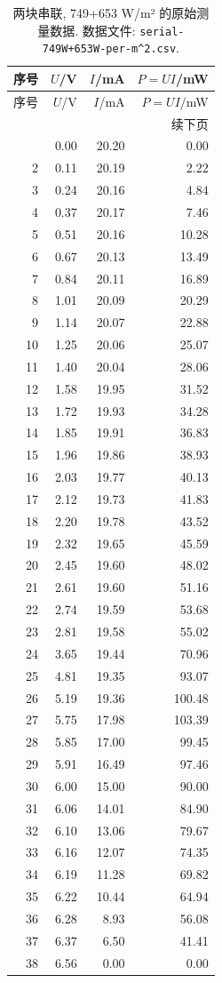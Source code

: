 \documentclass[UTF8,a4paper,11pt]{ctexart}
\begin{document}
\begin{longtable}{rrrr}
\caption{两块串联, 749+653 W/m² 的原始测量数据. 数据文件: \texttt{serial-749W+653W-per-m\textasciicircum{}2.csv}.}\\
\toprule
序号 & $U$/V & $I$/mA & $P=UI$/mW \\
\midrule
\endfirsthead
\toprule
序号 & $U$/V & $I$/mA & $P=UI$/mW \\
\midrule
\endhead
\midrule
\multicolumn{4}{r}{续下页} \\
\endfoot
\bottomrule
\endlastfoot
1 & 0.00 & 20.20 & 0.00 \\
2 & 0.11 & 20.19 & 2.22 \\
3 & 0.24 & 20.16 & 4.84 \\
4 & 0.37 & 20.17 & 7.46 \\
5 & 0.51 & 20.16 & 10.28 \\
6 & 0.67 & 20.13 & 13.49 \\
7 & 0.84 & 20.11 & 16.89 \\
8 & 1.01 & 20.09 & 20.29 \\
9 & 1.14 & 20.07 & 22.88 \\
10 & 1.25 & 20.06 & 25.07 \\
11 & 1.40 & 20.04 & 28.06 \\
12 & 1.58 & 19.95 & 31.52 \\
13 & 1.72 & 19.93 & 34.28 \\
14 & 1.85 & 19.91 & 36.83 \\
15 & 1.96 & 19.86 & 38.93 \\
16 & 2.03 & 19.77 & 40.13 \\
17 & 2.12 & 19.73 & 41.83 \\
18 & 2.20 & 19.78 & 43.52 \\
19 & 2.32 & 19.65 & 45.59 \\
20 & 2.45 & 19.60 & 48.02 \\
21 & 2.61 & 19.60 & 51.16 \\
22 & 2.74 & 19.59 & 53.68 \\
23 & 2.81 & 19.58 & 55.02 \\
24 & 3.65 & 19.44 & 70.96 \\
25 & 4.81 & 19.35 & 93.07 \\
26 & 5.19 & 19.36 & 100.48 \\
27 & 5.75 & 17.98 & 103.39 \\
28 & 5.85 & 17.00 & 99.45 \\
29 & 5.91 & 16.49 & 97.46 \\
30 & 6.00 & 15.00 & 90.00 \\
31 & 6.06 & 14.01 & 84.90 \\
32 & 6.10 & 13.06 & 79.67 \\
33 & 6.16 & 12.07 & 74.35 \\
34 & 6.19 & 11.28 & 69.82 \\
35 & 6.22 & 10.44 & 64.94 \\
36 & 6.28 & 8.93 & 56.08 \\
37 & 6.37 & 6.50 & 41.41 \\
38 & 6.56 & 0.00 & 0.00 \\
\end{longtable}
\newpage
\end{document}
